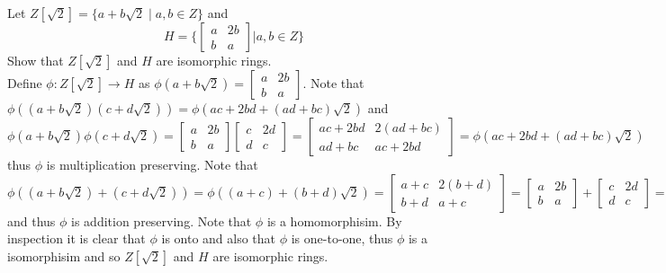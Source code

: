 \documentclass[12pt]{article}
\makeatletter
\theoremstyle{homework}
\newenvironment{exercise}[1]
{\def\@currentlabel{#1}\exercisecore}
{\endexercisecore}
\makeatother
\begin{document}
\begin{exercise}{15.14}
Let $Z[\sqrt{2}]=\{a+b\sqrt{2}\mid a,b\in Z\}$ and
$$H=\biggr\{ \begin{bmatrix}
a & 2b \\ b & a
\end{bmatrix} \biggr|a,b\in Z\biggr\} $$
Show that $Z[\sqrt{2}]$ and $H$ are isomorphic rings.\\
Define $\phi:Z[\sqrt{2}]\rightarrow H$ as $\phi(a+b\sqrt{2})=\begin{bmatrix}
a & 2b \\ b & a
\end{bmatrix}$.  Note that $\phi((a+b\sqrt{2})(c+d\sqrt{2}))=\phi(ac+2bd+(ad+bc)\sqrt{2})$ and $\phi(a+b\sqrt{2})\phi(c+d\sqrt{2})=\begin{bmatrix}
a & 2b \\ b & a
\end{bmatrix}\begin{bmatrix}
c & 2d \\ d & c
\end{bmatrix}=\begin{bmatrix}
ac+2bd & 2(ad+bc) \\ ad+bc & ac+2bd
\end{bmatrix}=\phi(ac+2bd+(ad+bc)\sqrt{2})$ thus $\phi$ is multiplication preserving.  Note that $\phi((a+b\sqrt{2})+(c+d\sqrt{2}))=\phi((a+c)+(b+d)\sqrt{2})=\begin{bmatrix}
a+c & 2(b+d) \\ b+d & a+c
\end{bmatrix}=\begin{bmatrix}
a & 2b \\ b & a
\end{bmatrix}+\begin{bmatrix}
c & 2d \\ d & c
\end{bmatrix}=
\phi(a+b\sqrt{2})+\phi(c+d\sqrt{2})$ and thus $\phi$ is addition preserving.  Note that $\phi$ is a homomorphisim.  By inspection it is clear that $\phi$ is onto and also that $\phi$ is one-to-one, thus $\phi$ is a isomorphisim and so $Z[\sqrt{2}]$ and $H$ are isomorphic rings.
\end{exercise}
\end{document}
